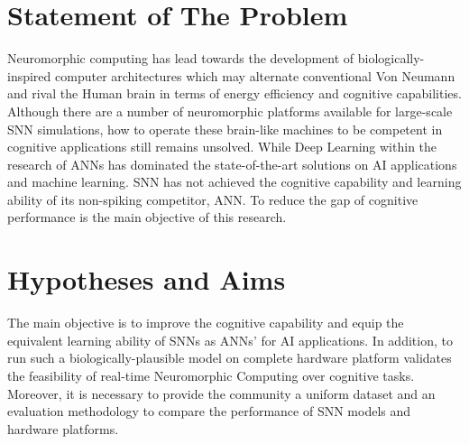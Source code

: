 \section{Statement of The Problem}
\label{sec:problem}
Neuromorphic computing has lead towards the development of biologically-inspired computer architectures which may alternate conventional Von Neumann and rival the Human brain in terms of energy efficiency and cognitive capabilities.
Although there are a number of neuromorphic platforms available for large-scale SNN simulations, how to operate these brain-like machines to be competent in cognitive applications still remains unsolved.
While Deep Learning within the research of ANNs has dominated the state-of-the-art solutions on AI applications and machine learning.
SNN has not achieved the cognitive capability and learning ability of its non-spiking competitor, ANN.
To reduce the gap of cognitive performance is the main objective of this research.


\section{Hypotheses and Aims}
\label{sec:aim}
The main objective is to improve the cognitive capability and equip the equivalent learning ability of SNNs as ANNs' for AI applications.
In addition, to run such a biologically-plausible model on complete hardware platform validates the feasibility of real-time Neuromorphic Computing over cognitive tasks.
Moreover, it is necessary to provide the community a uniform dataset and an evaluation methodology to compare the performance of SNN models and hardware platforms.


